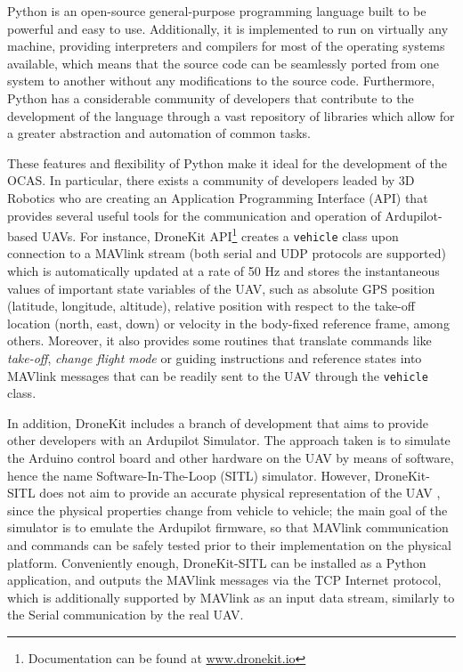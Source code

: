 Python is an open-source general-purpose programming language built to be powerful and easy to use.
Additionally, it is implemented to run on virtually any machine, providing interpreters and compilers for most of the operating systems available, which means that the source code can be seamlessly ported from one system to another without any modifications to the source code.
Furthermore, Python has a considerable community of developers that contribute to the development of the language through a vast repository of libraries which allow for a greater abstraction and automation of common tasks.

These features and flexibility of Python make it ideal for the development of the OCAS.
In particular, there exists a community of developers leaded by 3D Robotics who are creating an Application Programming Interface (API) that provides several useful tools for the communication and operation of Ardupilot-based UAVs.
For instance, DroneKit API\footnote{Documentation can be found at \url{www.dronekit.io}} creates a \texttt{vehicle} class upon connection to a MAVlink stream (both serial and UDP protocols are supported) which is automatically updated at a rate of 50 Hz and stores the instantaneous values of important state variables of the UAV, such as absolute GPS position (latitude, longitude, altitude), relative position with respect to the take-off location (north, east, down) or velocity in the body-fixed reference frame, among others.
Moreover, it also provides some routines that translate commands like \emph{take-off}, \emph{change flight mode} or guiding instructions and reference states into MAVlink messages that can be readily sent to the UAV through the \texttt{vehicle} class.

In addition, DroneKit includes a branch of development that aims to provide other developers with an Ardupilot Simulator.
The approach taken is to simulate the Arduino control board and other hardware on the UAV by means of software, hence the name Software-In-The-Loop (SITL) simulator.
However, DroneKit-SITL does not aim to provide an accurate physical representation of the UAV \cite{vegaastorga2016}, since the physical properties change from vehicle to vehicle; the main goal of the simulator is to emulate the Ardupilot firmware, so that MAVlink communication and commands can be safely tested prior to their implementation on the physical platform.
Conveniently enough, DroneKit-SITL can be installed as a Python application, and outputs the MAVlink messages via the TCP Internet protocol, which is additionally supported by MAVlink as an input data stream, similarly to the Serial communication by the real UAV.

